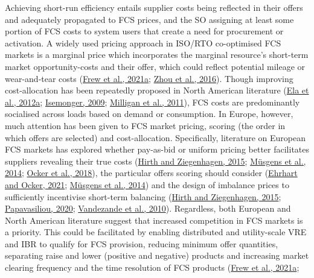\documentclass[12pt,a4paper,]{report}
\begin{document}
Achieving short-run efficiency entails supplier costs being reflected in
their offers and adequately propagated to FCS prices, and the SO
assigning at least some portion of FCS costs to system users that create
a need for procurement or activation. A widely used pricing approach in
ISO/RTO co-optimised FCS markets is a marginal price which incorporates
the marginal resource's short-term market opportunity-costs and their
offer, which could reflect potential mileage or wear-and-tear costs
(\protect\hyperlink{ref-frewImpactOperatingReserve2021}{Frew et al.,
2021a}; \protect\hyperlink{ref-zhouSurveyAncillaryServices2016}{Zhou et
al., 2016}). Though improving cost-allocation has been repeatedly
proposed in North American literature
(\protect\hyperlink{ref-elaEffectiveAncillaryServices2012}{Ela et al.,
2012a};
\protect\hyperlink{ref-isemongerEvolvingDesignRTO2009}{Isemonger, 2009};
\protect\hyperlink{ref-milliganIntegrationVariableGeneration2011}{Milligan
et al., 2011}), FCS costs are predominantly socialised across loads
based on demand or consumption. In Europe, however, much attention has
been given to FCS market pricing, scoring (the order in which offers are
selected) and cost-allocation. Specifically, literature on European FCS
markets has explored whether pay-as-bid or uniform pricing better
facilitates suppliers revealing their true costs
(\protect\hyperlink{ref-hirthBalancingPowerVariable2015}{Hirth and
Ziegenhagen, 2015};
\protect\hyperlink{ref-musgensEconomicsDesignBalancing2014}{Müsgens et
al., 2014};
\protect\hyperlink{ref-ockerHarmonizationEuropeanBalancing2018}{Ocker et
al., 2018}), the particular offers scoring should consider
(\protect\hyperlink{ref-ehrhartDesignRegulationBalancing2021}{Ehrhart
and Ocker, 2021};
\protect\hyperlink{ref-musgensEconomicsDesignBalancing2014}{Müsgens et
al., 2014}) and the design of imbalance prices to sufficiently
incentivise short-term balancing
(\protect\hyperlink{ref-hirthBalancingPowerVariable2015}{Hirth and
Ziegenhagen, 2015};
\protect\hyperlink{ref-papavasiliouScarcityPricingMissing2020}{Papavasiliou,
2020};
\protect\hyperlink{ref-vandezandeWellfunctioningBalancingMarkets2010}{Vandezande
et al., 2010}). Regardless, both European and North American literature
suggest that increased competition in FCS markets is a priority. This
could be facilitated by enabling distributed and utility-scale VRE and
IBR to qualify for FCS provision, reducing minimum offer quantities,
separating raise and lower (positive and negative) products and
increasing market clearing frequency and the time resolution of FCS
products (\protect\hyperlink{ref-frewImpactOperatingReserve2021}{Frew et
al., 2021a};
\end{document}
